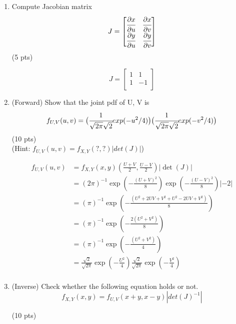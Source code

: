 \documentclass[a4paper]{article}
\theoremstyle{definition}
\newenvironment{soln}{
	\leavevmode\color{blue}\ignorespaces
}{}
\begin{document}
	\begin{enumerate}[label=(\alph*)]
		\item Compute Jacobian matrix $$J=\begin{bmatrix}
			\cfrac{\partial x}{\partial u} & \cfrac{\partial x}{\partial v}\\
			\cfrac{\partial y}{\partial u} & \cfrac{\partial y}{\partial v}
		\end{bmatrix}
		$$
		\hfill (5 pts)
		
		\begin{soln} 
			$$J = \begin{bmatrix}
				1 & 1 \\
				1 & -1 \\
			\end{bmatrix}$$
		\end{soln}
		
		
		\item (Forward) Show that the joint pdf of U, V is
		$$f_{U, V}(u, v)=\big (\cfrac{1}{\sqrt{2\pi}\sqrt{2}}exp(-u^{2}/4)\big ) \big (\cfrac{1}{\sqrt{2\pi}\sqrt{2}}exp(-v^{2}/4)\big )$$
		\hfill (10 pts) \\
		(Hint: $f_{U, V}(u, v)=f_{X, Y}(?, ?)|det(J)|$) \\
		
		\begin{soln}
			$$ \begin{aligned}
				f_{U,V}(u,v) & = f_{X,Y}(x,y)\left(\frac{U+V}{2}, \frac{U-V}{2}\right)|\det(J)|\\
				& = (2\pi)^{-1}\exp\left(-\frac{(U+V)^2}{8}\right)\exp\left(-\frac{(U-V)^2}{8}\right) |-2|\\
				& = (\pi)^{-1}\exp\left(-\frac{(U^2+2UV+V^2+U^2-2UV+V^2)}{8}\right) \\
				& = (\pi)^{-1}\exp\left(-\frac{2(U^2+V^2)}{8}\right) \\ 
				& = (\pi)^{-1}\exp\left(-\frac{(U^2+V^2)}{4}\right) \\ 
				& = \frac{\sqrt{2}}{\sqrt{2\pi}}\exp\left(-\frac{U^2}{4}\right)\frac{\sqrt{2}}{\sqrt{2\pi}}\exp\left(-\frac{V^2}{4}\right) \\
			\end{aligned} $$
		\end{soln}
		
		\item (Inverse) Check whether the following equation holds or not.
		$$f_{X, Y}(x, y)=f_{U, V}(x+y, x-y)|det(J)^{-1}|$$
		
		\hfill (10 pts) 
		

\end{enumerate}
\end{document}
